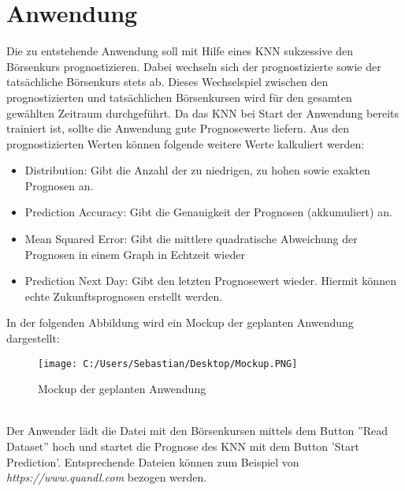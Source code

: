 \documentclass[11pt,a4paper]{article}
\begin{document}
\section{Anwendung}
Die zu entstehende Anwendung soll mit Hilfe eines KNN sukzessive den Börsenkurs prognostizieren. Dabei wechseln sich der prognostizierte sowie der 
tatsächliche Börsenkurs stets ab. Dieses Wechselspiel zwischen den prognostizierten und tatsächlichen Börsenkursen wird für den gesamten 
gewählten Zeitraum durchgeführt. Da das KNN bei Start der Anwendung bereits trainiert ist, sollte die Anwendung gute Prognosewerte liefern.
Aus den prognostizierten Werten können folgende weitere Werte kalkuliert werden:
\begin{itemize}
	\item Distribution: Gibt die Anzahl der zu niedrigen, zu hohen sowie exakten Prognosen an.
	\item Prediction Accuracy: Gibt die Genauigkeit der Prognosen (akkumuliert) an.
	\item Mean Squared Error: Gibt die mittlere quadratische Abweichung der Prognosen in einem Graph in Echtzeit wieder
	\item Prediction Next Day: Gibt den letzten Prognosewert wieder. Hiermit können echte Zukunftsprognosen erstellt werden.
\end{itemize}
In der folgenden Abbildung wird ein Mockup der geplanten Anwendung dargestellt:
\\
\begin{figure}[h]
\centering
	\texttt{[image: C:/Users/Sebastian/Desktop/Mockup.PNG]}
	\label{fig:Mockup}
	\caption{Mockup der geplanten Anwendung}
\end{figure}
\\
Der Anwender lädt die Datei mit den Börsenkursen mittels dem Button ''Read Dataset'' hoch und startet die Prognose des KNN mit dem Button 'Start Prediction'. Entsprechende Dateien 
können zum Beispiel von \textit{https://www.quandl.com} bezogen werden.
\end{document}
